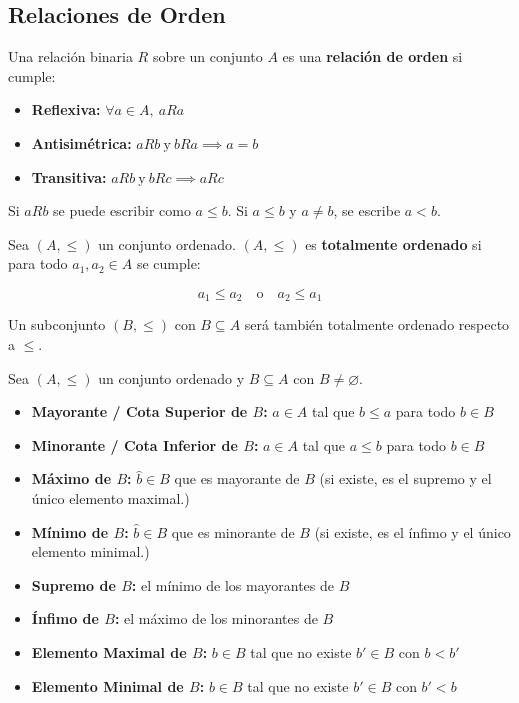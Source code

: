 \documentclass[a4paper,12pt]{article}
\begin{document}
\subsection{Relaciones de Orden}

\begin{procedimiento}[title=Definición de Relación de Orden]
Una relación binaria \(R\) sobre un conjunto \(A\) es una \textbf{relación de orden} si cumple:  

\begin{itemize}
    \item \textbf{Reflexiva:} \(\forall a \in A, \ aRa\)
    \item \textbf{Antisimétrica:} \(aRb \ \text{y} \ bRa \implies a = b\)
    \item \textbf{Transitiva:} \(aRb \ \text{y} \ bRc \implies aRc\)
\end{itemize}

Si \(aRb\) se puede escribir como \(a \le b\).  
Si \(a \le b\) y \(a \neq b\), se escribe \(a < b\).
\end{procedimiento}

\begin{procedimiento}[title=Orden Total]
Sea \((A, \le)\) un conjunto ordenado.  
\((A, \le)\) es \textbf{totalmente ordenado} si para todo \(a_1, a_2 \in A\) se cumple:

\[
a_1 \le a_2 \quad \text{o} \quad a_2 \le a_1
\]

Un subconjunto \((B, \le)\) con \(B \subseteq A\) será también totalmente ordenado respecto a \(\le\).
\end{procedimiento}

\begin{procedimiento}[title=Elementos Distinguidos de un Conjunto Ordenado]
Sea \((A, \le)\) un conjunto ordenado y \(B \subseteq A\) con \(B \neq \varnothing\).  

\begin{itemize}
    \item \textbf{Mayorante / Cota Superior de \(B\):} \(a \in A\) tal que \(b \le a\) para todo \(b \in B\)
    \item \textbf{Minorante / Cota Inferior de \(B\):} \(a \in A\) tal que \(a \le b\) para todo \(b \in B\)
    \item \textbf{Máximo de \(B\):} \(\hat{b} \in B\) que es mayorante de \(B\) (si existe, es el supremo y el único elemento maximal.)
    \item \textbf{Mínimo de \(B\):} \(\hat{b} \in B\) que es minorante de \(B\) (si existe, es el ínfimo y el único elemento minimal.)
    \item \textbf{Supremo de \(B\):} el mínimo de los mayorantes de \(B\)
    \item \textbf{Ínfimo de \(B\):} el máximo de los minorantes de \(B\)
    \item \textbf{Elemento Maximal de \(B\):} \(b \in B\) tal que no existe \(b' \in B\) con \(b < b'\)
    \item \textbf{Elemento Minimal de \(B\):} \(b \in B\) tal que no existe \(b' \in B\) con \(b' < b\)
\end{itemize}
\end{procedimiento}
\end{document}

